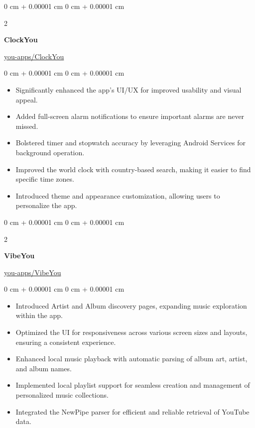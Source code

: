 \documentclass[10pt, letterpaper]{article}
\newenvironment{highlights}{
	\begin{itemize}[
		topsep=0.10 cm,
		parsep=0.10 cm,
		partopsep=0pt,
		itemsep=0pt,
		leftmargin=0 cm + 10pt
		]
	}{
	\end{itemize}
} %
\newenvironment{onecolentry}{
	\begin{adjustwidth}{
			0 cm + 0.00001 cm
		}{
			0 cm + 0.00001 cm
		}
	}{
	\end{adjustwidth}
} %
\newenvironment{twocolentry}[2][]{
	\onecolentry
	\def\secondColumn{#2}
	\setcolumnwidth{\fill, 4.5 cm}
	\begin{paracol}{2}
	}{
		\switchcolumn \raggedleft \secondColumn
	\end{paracol}
	\endonecolentry
} %
\begin{document}
	\vspace{0.2 cm}
	
	\begin{twocolentry}{\href{https://github.com/you-apps/ClockYou}{you-apps/ClockYou}}
		\textbf{ClockYou}
	\end{twocolentry}
	\vspace{0.10 cm}
	\begin{onecolentry}
		\begin{highlights}
			\item Significantly enhanced the app's UI/UX for improved usability and visual appeal.
			\item Added full-screen alarm notifications to ensure important alarms are never missed.
			\item Bolstered timer and stopwatch accuracy by leveraging Android Services for background operation.
			\item Improved the world clock with country-based search, making it easier to find specific time zones.
			\item Introduced theme and appearance customization, allowing users to personalize the app.
		\end{highlights}
	\end{onecolentry}
	
	\vspace{0.2 cm}
	
	\begin{twocolentry}{\href{https://github.com/you-apps/VibeYou}{you-apps/VibeYou}}
		\textbf{VibeYou}
	\end{twocolentry}
	\vspace{0.10 cm}
	\begin{onecolentry}
		\begin{highlights}
			\item Introduced Artist and Album discovery pages, expanding music exploration within the app.
			\item Optimized the UI for responsiveness across various screen sizes and layouts, ensuring a consistent experience.
			\item Enhanced local music playback with automatic parsing of album art, artist, and album names.
			\item Implemented local playlist support for seamless creation and management of personalized music collections.
			\item Integrated the NewPipe parser for efficient and reliable retrieval of YouTube data.
		\end{highlights}
	\end{onecolentry}
	
\end{document}
